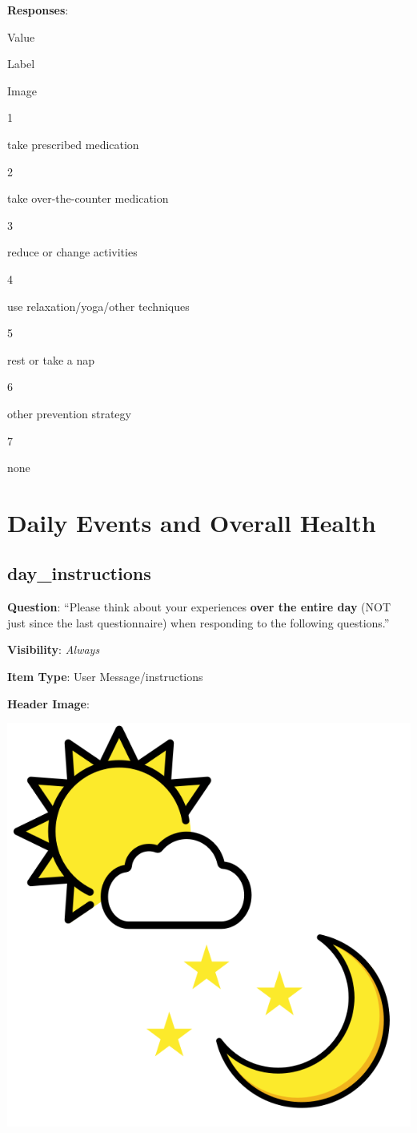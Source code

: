 \documentclass[]{book}
\begin{document}
\textbf{Responses}:

Value

Label

Image

1

take prescribed medication

2

take over-the-counter medication

3

reduce or change activities

4

use relaxation/yoga/other techniques

5

rest or take a nap

6

other prevention strategy

7

none

\hypertarget{daily_section}{%
\chapter{Daily Events and Overall Health}\label{daily_section}}

\hypertarget{day_instructions}{%
\section{day\_instructions}\label{day_instructions}}

\textbf{Question}: ``Please think about your experiences \textbf{over the entire day} (NOT just since the last questionnaire) when responding to the following questions.''

\textbf{Visibility}: \emph{Always}

\textbf{Item Type}: User Message/instructions

\textbf{Header Image}:

\begin{flushleft}\includegraphics[width=0.33\linewidth]{downloadFigs4latex_NIMH_Applet_Codebook/day_instructions_headerImg} \end{flushleft}
\end{document}
